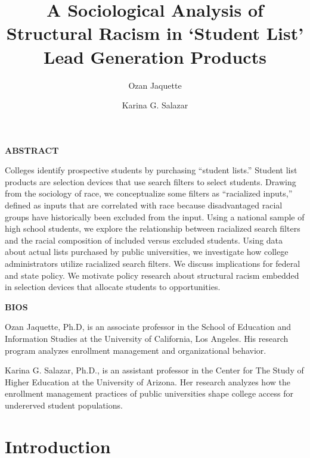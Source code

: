 \documentclass[
  12pt,
]{article}
\title{A Sociological Analysis of Structural Racism in `Student List' Lead Generation Products}
\author{Ozan Jaquette \and Karina G. Salazar}
\date{}
\begin{document}
\maketitle


\titlespacing{\section}{0pt}{0pc}{0pc}
\titlespacing{\subsection}{0pt}{0pc}{0pc}

\textbf{ABSTRACT}

Colleges identify prospective students by purchasing ``student lists.'' Student list products are selection devices that use search filters to select students. Drawing from the sociology of race, we conceptualize some filters as ``racialized inputs,'' defined as inputs that are correlated with race because disadvantaged racial groups have historically been excluded from the input. Using a national sample of high school students, we explore the relationship between racialized search filters and the racial composition of included versus excluded students. Using data about actual lists purchased by public universities, we investigate how college administrators utilize racialized search filters. We discuss implications for federal and state policy. We motivate policy research about structural racism embedded in selection devices that allocate students to opportunities.

\textbf{BIOS}

Ozan Jaquette, Ph.D, is an associate professor in the School of Education and Information Studies at the University of California, Los Angeles. His research program analyzes enrollment management and organizational behavior.

Karina G. Salazar, Ph.D., is an assistant professor in the Center for The Study of Higher Education at the University of Arizona. Her research analyzes how the enrollment management practices of public universities shape college access for undererved student populations.

\newpage
{}

\hypertarget{introduction}{%
\section{Introduction}\label{introduction}}
\end{document}

